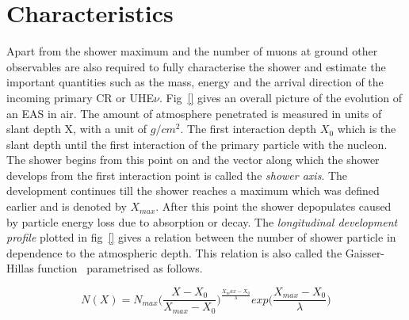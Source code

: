 \section{Characteristics}
\label{sec:EAS_cha}
Apart from the shower maximum and the number of muons at ground other observables are also required to fully characterise the shower and estimate the important quantities such as the mass, energy and the arrival direction of the incoming primary CR or UHE$\nu$. Fig~\ref{} gives an overall picture of the evolution of an EAS in air. The amount of atmosphere penetrated is measured in units of slant depth X, with a unit of $g/cm^2$. The first interaction depth $X_0$ which is the slant depth until the first interaction of the primary particle with the nucleon. The shower begins from this point on and the vector along which the shower develops from the first interaction point is called the \textit{shower axis}. The development continues till the shower reaches a maximum which was defined earlier and is denoted by $X_{max}$. After this point the shower depopulates caused by particle energy loss due to absorption or decay. The \textit{longitudinal development profile} plotted in fig~\ref{} gives a relation between the number of shower particle in dependence to the atmospheric depth. This relation is also called the Gaisser-Hillas function~\cite{} parametrised as follows.

\begin{equation}
    N(X) =  N_{max} \biggl(\frac{X- X_0}{X_{max} -  X_0}\biggr)^{\frac{X_max-X_0}{\lambda}} exp\biggl(\frac{X_{max}-X_0}{\lambda}\biggr)
\end{equation}

